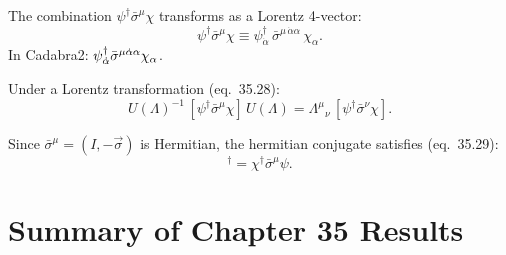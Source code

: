 The combination $\psi^\dagger\bar\sigma^\mu\chi$ transforms as a
Lorentz 4-vector:
\begin{equation}
  \psi^\dagger\bar\sigma^\mu\chi
  \equiv \psi^\dagger_{\dot\alpha}\,\bar\sigma^{\mu\,\dot\alpha\alpha}\,\chi_\alpha.
  \tag{35.27}
\end{equation}
In Cadabra2: $\psi^{\dagger}_{\dot{\alpha}} \bar{\sigma}^{\mu \dot{\alpha} \alpha} \chi_{\alpha}$.

\medskip
Under a Lorentz transformation (eq.~35.28):
\begin{equation}
  U(\Lambda)^{-1}\,[\psi^\dagger\bar\sigma^\mu\chi]\,U(\Lambda)
  = {\Lambda^\mu}{}_\nu\,[\psi^\dagger\bar\sigma^\nu\chi].
  \tag{35.28}
\end{equation}

Since $\bar\sigma^\mu = (I,-\vec\sigma)$ is Hermitian,
the hermitian conjugate satisfies (eq.~35.29):
\begin{equation}
  [\psi^\dagger\bar\sigma^\mu\chi]^\dagger = \chi^\dagger\bar\sigma^\mu\psi.
  \tag{35.29}
\end{equation}

\section{Summary of Chapter 35 Results}

